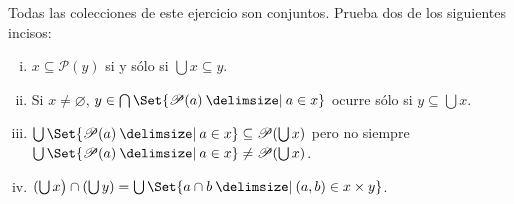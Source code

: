 \documentclass[10pt]{article}
\providecommand\st{}
\newcommand\SetSymbol[1][]{%
    \nonscript\:#1\vert
    \allowbreak
    \nonscript\:
    \mathopen{}}
\renewcommand\st{\SetSymbol[\delimsize]}
\newcommand{\ms}[1]{\mathscr{#1}}
\renewcommand{\emptyset}{\varnothing}
\begin{document}
    \begin{exercise}
        Todas las colecciones de este ejercicio son conjuntos. Prueba dos de los siguientes incisos:
        \begin{enumerate}[i)]
            \item \(x \subseteq \ms{P}(y)\) si y sólo si \(\bigcup x \subseteq y\).
            \item Si \(x \neq \emptyset\), \(y \in \bigcap\Set{\ms{P}(a) \st a \in x}\) ocurre sólo si \(y \subseteq \bigcup x\).
            \item \( \bigcup \Set{ \ms{P}(a) \st a \in x } \subseteq \ms{P}(\bigcup x) \) pero no siempre \( \bigcup \Set{ \ms{P}(a) \st a \in x } \neq \ms{P}(\bigcup x) \).
            \item \( ( \bigcup x \big) \cap ( \bigcup y ) = \bigcup \Set{ a \cap b \st (a,b) \in x \times y } \).
        \end{enumerate}
    \end{exercise}
\end{document}
